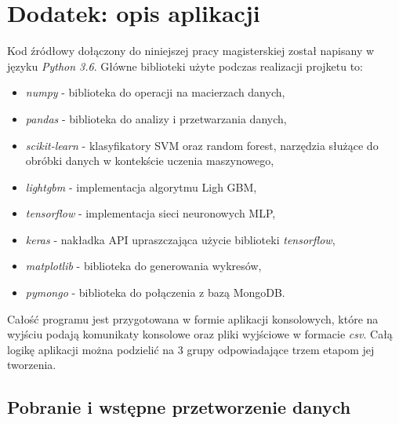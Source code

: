 \documentclass[a4paper, twoside, 11pt, openright]{article}
\begin{document}
\newpage


\listoffigures

\newpage 


\listoftables

\newpage


\section*{Dodatek: opis aplikacji}


Kod źródłowy dołączony do niniejszej pracy magisterskiej został napisany w języku \textit{Python 3.6}. Główne biblioteki użyte podczas realizacji projketu to:
\begin{itemize}
    \item \textit{numpy} - biblioteka do operacji na macierzach danych,
    \item \textit{pandas} - biblioteka do analizy i przetwarzania danych,
    \item \textit{scikit-learn} - klasyfikatory SVM oraz random forest, narzędzia służące do obróbki danych w kontekście uczenia maszynowego,
    \item \textit{lightgbm} - implementacja algorytmu Ligh GBM,
    \item \textit{tensorflow} - implementacja sieci neuronowych MLP,
    \item \textit{keras} - nakładka API upraszczająca użycie biblioteki \textit{tensorflow},
    \item \textit{matplotlib} - biblioteka do generowania wykresów,
    \item \textit{pymongo} - biblioteka do połączenia z bazą MongoDB.
\end{itemize}

Całość programu jest przygotowana w formie aplikacji konsolowych, które na wyjściu podają komunikaty konsolowe oraz pliki wyjściowe w formacie \textit{csv}. Całą logikę aplikacji można podzielić na 3 grupy odpowiadające trzem etapom jej tworzenia.

\bigskip

\subsection*{Pobranie i wstępne przetworzenie danych}
\end{document}
